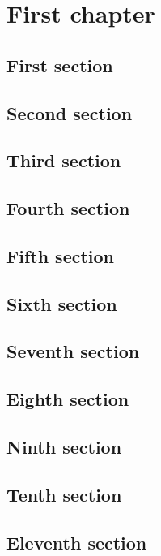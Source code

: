 \documentclass[oneside]{book}
\begin{document}
\dominitoc
\tableofcontents
\chapter{First chapter}
\minitoc
\begin{multicols}{2}
\section{First section}           
\section{Second section}          
\section{Third section}           
\section{Fourth section}          
\section{Fifth section}           
\section{Sixth section}           
\section{Seventh section}         
\section{Eighth section}          
\section{Ninth section}           
\section{Tenth section}           
\section{Eleventh section}        

\end{multicols}
\end{document}
